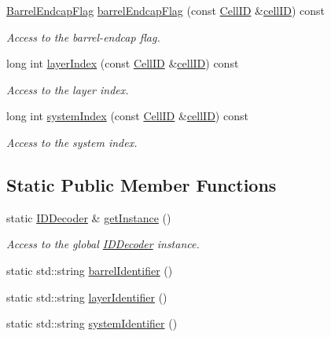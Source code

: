 \begin{DoxyCompactItemize}
\hyperlink{class_d_d4hep_1_1_d_d_rec_1_1_i_d_decoder_1_1_barrel_endcap_flag}{Barrel\+Endcap\+Flag} \hyperlink{class_d_d4hep_1_1_d_d_rec_1_1_i_d_decoder_a05f2fa448c0f8b4a3bf6413a16801f5e}{barrel\+Endcap\+Flag} (const \hyperlink{namespace_d_d4hep_1_1_d_d_rec_af5cecc2e566eeaedb430b92df23971d4}{Cell\+ID} \&\hyperlink{class_d_d4hep_1_1_d_d_rec_1_1_i_d_decoder_abdd26643ae2f9f70de21b3a4699799bb}{cell\+ID}) const
\begin{DoxyCompactList}\small\item\em Access to the barrel-\/endcap flag. \end{DoxyCompactList}\item 
long int \hyperlink{class_d_d4hep_1_1_d_d_rec_1_1_i_d_decoder_a4f2615fea1dbf5118127b53f4998df40}{layer\+Index} (const \hyperlink{namespace_d_d4hep_1_1_d_d_rec_af5cecc2e566eeaedb430b92df23971d4}{Cell\+ID} \&\hyperlink{class_d_d4hep_1_1_d_d_rec_1_1_i_d_decoder_abdd26643ae2f9f70de21b3a4699799bb}{cell\+ID}) const
\begin{DoxyCompactList}\small\item\em Access to the layer index. \end{DoxyCompactList}\item 
long int \hyperlink{class_d_d4hep_1_1_d_d_rec_1_1_i_d_decoder_a82c02cd260a4c2b72b3647e13f557dc4}{system\+Index} (const \hyperlink{namespace_d_d4hep_1_1_d_d_rec_af5cecc2e566eeaedb430b92df23971d4}{Cell\+ID} \&\hyperlink{class_d_d4hep_1_1_d_d_rec_1_1_i_d_decoder_abdd26643ae2f9f70de21b3a4699799bb}{cell\+ID}) const
\begin{DoxyCompactList}\small\item\em Access to the system index. \end{DoxyCompactList}\end{DoxyCompactItemize}
\subsection*{Static Public Member Functions}
\begin{DoxyCompactItemize}
\item 
static \hyperlink{class_d_d4hep_1_1_d_d_rec_1_1_i_d_decoder}{I\+D\+Decoder} \& \hyperlink{class_d_d4hep_1_1_d_d_rec_1_1_i_d_decoder_a9a7ec8c15a97dad8bdbc0743bb534c3f}{get\+Instance} ()
\begin{DoxyCompactList}\small\item\em Access to the global \hyperlink{class_d_d4hep_1_1_d_d_rec_1_1_i_d_decoder}{I\+D\+Decoder} instance. \end{DoxyCompactList}\item 
static std\+::string \hyperlink{class_d_d4hep_1_1_d_d_rec_1_1_i_d_decoder_ac5bd93061aef3850d7aca8711e8a507f}{barrel\+Identifier} ()
\item 
static std\+::string \hyperlink{class_d_d4hep_1_1_d_d_rec_1_1_i_d_decoder_a0eb172032d0261f4d8897f705ed94cee}{layer\+Identifier} ()
\item 
static std\+::string \hyperlink{class_d_d4hep_1_1_d_d_rec_1_1_i_d_decoder_a11948929195ead4902e59730ad4a582f}{system\+Identifier} ()
\end{DoxyCompactItemize}
